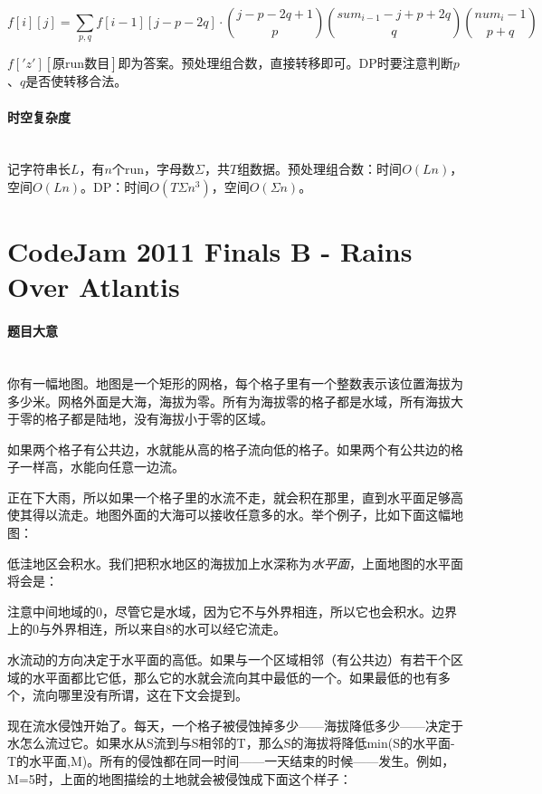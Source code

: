 \documentclass[UTF8]{ctexart}
\newcommand{\myparagraph}[1]{\paragraph{#1}\mbox{}\\}
\theoremstyle{nonumberplain}
\begin{document}
			$$ f[i][j]=\sum_{p,q} f[i-1][j-p-2q] \cdot \binom{j-p-2q+1}{p}\binom{sum_{i-1}-j+p+2q}{q}\binom{num_i-1}{p+q} $$
			
			$f['z'][\mbox{原run数目}]$即为答案。预处理组合数，直接转移即可。DP时要注意判断$p$、$q$是否使转移合法。
		
		\myparagraph{时空复杂度}
		
			记字符串长$L$，有$n$个run，字母数$\Sigma$，共$T$组数据。预处理组合数：时间$O(Ln)$，空间$O(Ln)$。DP：时间$O(T \Sigma n^3)$，空间$O(\Sigma n)$。
	
	\section{CodeJam 2011 Finals B - Rains Over Atlantis}
	
		\myparagraph{题目大意}
		
			你有一幅地图。地图是一个矩形的网格，每个格子里有一个整数表示该位置海拔为多少米。网格外面是大海，海拔为零。所有为海拔零的格子都是水域，所有海拔大于零的格子都是陆地，没有海拔小于零的区域。
		
			如果两个格子有公共边，水就能从高的格子流向低的格子。如果两个有公共边的格子一样高，水能向任意一边流。
		
			正在下大雨，所以如果一个格子里的水流不走，就会积在那里，直到水平面足够高使其得以流走。地图外面的大海可以接收任意多的水。举个例子，比如下面这幅地图：
		
			\begin{center}\end{center}
		
			低洼地区会积水。我们把积水地区的海拔加上水深称为\emph{水平面}，上面地图的水平面将会是：
		
			\begin{center}\end{center}
		
			注意中间地域的0，尽管它是水域，因为它不与外界相连，所以它也会积水。边界上的0与外界相连，所以来自8的水可以经它流走。
		
			水流动的方向决定于水平面的高低。如果与一个区域相邻（有公共边）有若干个区域的水平面都比它低，那么它的水就会流向其中最低的一个。如果最低的也有多个，流向哪里没有所谓，这在下文会提到。
		
			现在流水侵蚀开始了。每天，一个格子被侵蚀掉多少——海拔降低多少——决定于水怎么流过它。如果水从S流到与S相邻的T，那么S的海拔将降低min(S的水平面-T的水平面,M)。所有的侵蚀都在同一时间——一天结束的时候——发生。例如，M=5时，上面的地图描绘的土地就会被侵蚀成下面这个样子：
		
\end{document}
